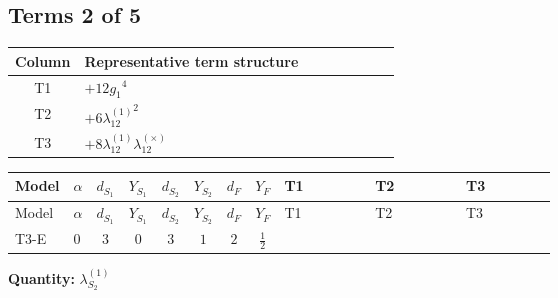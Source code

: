 \documentclass[8pt]{article}
\begin{document}
\begin{landscape}
\subsection*{Terms 2 of 5}
\begin{center}
\begin{tabular}{@{}c >{\raggedright\arraybackslash}p{0.82\linewidth}@{}}
\toprule
Column & Representative term structure \\
\midrule
T1 & \(\displaystyle +12 {g_1}^4\) \\
\midrule
T2 & \(\displaystyle +6 {\lambda_{12}^{(1)}}^2\) \\
\midrule
T3 & \(\displaystyle +8 {\lambda_{12}^{(1)}} {\lambda_{12}^{(\times)}}\) \\
\midrule
\bottomrule
\end{tabular}
\end{center}
\smallskip
\tiny
\begin{longtable}{@{}llcccccc >{\raggedright\arraybackslash}p{0.21\linewidth} >{\raggedright\arraybackslash}p{0.21\linewidth} >{\raggedright\arraybackslash}p{0.21\linewidth}@{}}
\toprule
Model & $\alpha$ & $d_{S_1}$ & $Y_{S_1}$ & $d_{S_2}$ & $Y_{S_2}$ & $d_F$ & $Y_F$ & T1 & T2 & T3 \\
\midrule
\endfirsthead
\toprule
Model & $\alpha$ & $d_{S_1}$ & $Y_{S_1}$ & $d_{S_2}$ & $Y_{S_2}$ & $d_F$ & $Y_F$ & T1 & T2 & T3 \\
\midrule
\endhead
T3-E & $0$ & $3$ & $0$ & $3$ & $1$ & $2$ & $\frac{1}{2}$ & \scriptsize\adjustbox{max width=\linewidth}{$\begin{gathered} +12 {g_1}^4\end{gathered}$} & \scriptsize\adjustbox{max width=\linewidth}{$\begin{gathered} +6 {\lambda_{12}^{(1)}}^2\end{gathered}$} & \scriptsize\adjustbox{max width=\linewidth}{$\begin{gathered} +8 {\lambda_{12}^{(1)}} {\lambda_{12}^{(\times)}}\end{gathered}$} \\
\midrule
\bottomrule
\end{longtable}
\clearpage
\noindent\textbf{Quantity: }$\lambda_{S_2}^{(1)}$\par\smallskip

\end{landscape}
\end{document}
